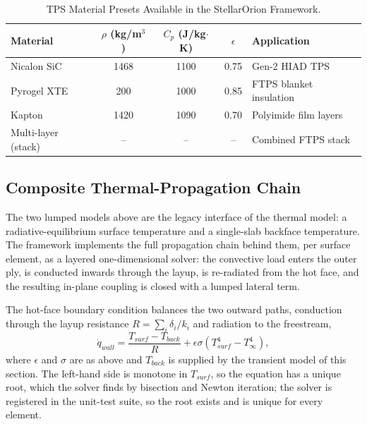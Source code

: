 \begin{table}[H]
    \centering
    \caption{TPS Material Presets Available in the StellarOrion Framework.}
    \label{tab:tps_materials}
    \begin{tabularx}{\textwidth}{|l|c|c|c|>{\RaggedRight\arraybackslash}X|}
        \hline
        \textbf{Material} & \textbf{$\rho$ (kg/m$^3$)} & \textbf{$C_p$ (J/kg$\cdot$K)} & \textbf{$\epsilon$} & \textbf{Application} \\ \hline
        Nicalon SiC & 1468 & 1100 & 0.75 & Gen-2 HIAD TPS \\ \hline
        Pyrogel XTE & 200 & 1000 & 0.85 & FTPS blanket insulation \\ \hline
        Kapton & 1420 & 1090 & 0.70 & Polyimide film layers \\ \hline
        Multi-layer (stack) & -- & -- & -- & Combined FTPS stack \\ \hline
    \end{tabularx}
\end{table}

\subsection{Composite Thermal-Propagation Chain}
\label{sec:thermal_chain}

The two lumped models above are the legacy interface of the thermal model: a radiative-equilibrium surface temperature and a single-slab backface temperature. The framework implements the full propagation chain behind them, per surface element, as a layered one-dimensional solver: the convective load enters the outer ply, is conducted inwards through the layup, is re-radiated from the hot face, and the resulting in-plane coupling is closed with a lumped lateral term.

The hot-face boundary condition balances the two outward paths, conduction through the layup resistance $R=\sum_i \delta_i/k_i$ and radiation to the freestream,
\begin{equation}
    \dot{q}_{wall} = \frac{T_{surf}-T_{back}}{R} + \epsilon\sigma\left(T_{surf}^{4}-T_{\infty}^{4}\right),
    \label{eq:thermal_balance}
\end{equation}
where $\epsilon$ and $\sigma$ are as above and $T_{back}$ is supplied by the transient model of this section. The left-hand side is monotone in $T_{surf}$, so the equation has a unique root, which the solver finds by bisection and Newton iteration; the solver is registered in the unit-test suite, so the root exists and is unique for every element.

